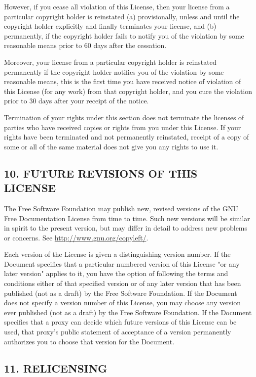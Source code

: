 However, if you cease all violation of this License, then your license from a particular copyright holder is reinstated (a) provisionally, 
unless and until the copyright holder explicitly and finally terminates your license, and (b) permanently, if the copyright holder fails to 
notify you of the violation by some reasonable means prior to 60 days after the cessation.

Moreover, your license from a particular copyright holder is reinstated permanently if the copyright holder notifies you of the violation 
by some reasonable means, this is the first time you have received notice of violation of this License (for any work) from that copyright holder, 
and you cure the violation prior to 30 days after your receipt of the notice.

Termination of your rights under this section does not terminate the licenses of parties who have received copies or rights from you under 
this License. If your rights have been terminated and not permanently reinstated, receipt of a copy of some or all of the same material does 
not give you any rights to use it.


\subsection*{10. FUTURE REVISIONS OF THIS LICENSE}

The Free Software Foundation may publish new, revised versions of the GNU Free Documentation License from time to time. Such new versions will be 
similar in spirit to the present version, but may differ in detail to address new problems or concerns. See \url{http://www.gnu.org/copyleft/}.

Each version of the License is given a distinguishing version number. If the Document specifies that a particular numbered version of 
this License "or any later version" applies to it, you have the option of following the terms and conditions either of that specified 
version or of any later version that has been published (not as a draft) by the Free Software Foundation. If the Document does not specify 
a version number of this License, you may choose any version ever published (not as a draft) by the Free Software Foundation. If the 
Document specifies that a proxy can decide which future versions of this License can be used, that proxy's public statement of acceptance 
of a version permanently authorizes you to choose that version for the Document.


\subsection*{11. RELICENSING}

